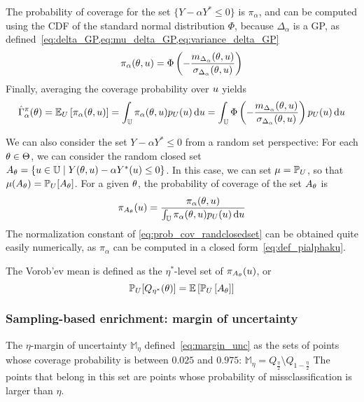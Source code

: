 \documentclass[../../Main_ManuscritThese.tex]{subfiles}
\begin{document}
  
The probability of coverage for the set $\{Y - \alpha Y^*\leq 0\}$ is $\pi_{\alpha}$, and can be computed using the CDF of the standard normal distribution $\Phi$, because $\Delta_{\alpha}$ is a GP, as defined~\cref{eq:delta_GP,eq:mu_delta_GP,eq:variance_delta_GP}
\begin{equation}
  \label{eq:def_pialphaku}
  \pi_{\alpha}(\theta,u) = \Phi\left(-\frac{m_{\Delta_\alpha}(\theta,u)}{\sigma_{\Delta_\alpha}(\theta,u)}\right)
\end{equation}
Finally, averaging the coverage probability over $u$ yields
\begin{equation}
  \hat{\Gamma}_{\alpha}^{\pi}(\theta) = \mathbb{E}_U\left[\pi_{\alpha}(\theta,u)\right]=\int_{\mathbb{U}}\pi_{\alpha}(\theta,u)p_{U}(u) \,\mathrm{d}u = \int_{\mathbb{U}}\Phi\left(-\frac{m_{\Delta_\alpha}(\theta,u)}{\sigma_{\Delta_\alpha}(\theta,u)}\right)p_{U}(u) \,\mathrm{d}u
\end{equation}


We can also consider the set $Y - \alpha Y^* \leq 0$ from a random set perspective:
For each $\theta\in\Theta$, we can consider the random closed set $A_\theta =  \{u \in \mathbb{U} \mid Y(\theta, u) - \alpha Y^*(u) \leq 0\}$.
In this case, we can set $\mu = \mathbb{P}_{U}$, so that $\mu(A_{\theta}) = \mathbb{P}_{U}[A_{\theta}]$.
For a given $\theta$, the probability of coverage of the set $A_{\theta}$
is
\begin{equation}
  \label{eq:prob_cov_randclosedset}
  \pi_{A_{\theta}}(u) = \frac{\pi_{\alpha}(\theta, u)}{\int_{\mathbb{U}} \pi_{\alpha}(\theta, u)p_{U}(u)\,\mathrm{d}u}
\end{equation}
The normalization constant of \cref{eq:prob_cov_randclosedset} can be obtained quite easily numerically, as $\pi_{\alpha}$ can be computed in a closed form~\cref{eq:def_pialphaku}.

The Vorob'ev mean is defined as the $\eta^*$-level set of $\pi_{A_\theta}(u)$, or
\begin{equation}
  \mathbb{P}_{U}[Q_{\eta^*}(\theta)] = \mathbb{E}\left[\mathbb{P}_{U}\left[A_{\theta}\right]\right]
\end{equation}


\subsubsection{Sampling-based enrichment: margin of uncertainty}
The $\eta$-margin of uncertainty $\mathbb{M}_{\eta}$ defined~\cref{eq:margin_unc} as the sets of points whose coverage probability is between $0.025$ and $0.975$: $\mathbb{M}_{\eta} = Q_{\frac{\eta}{2}} \setminus Q_{1-\frac{\eta}{2}}$
The points that belong in this set are points whose probability of missclassification is larger than $\eta$.
\end{document}
